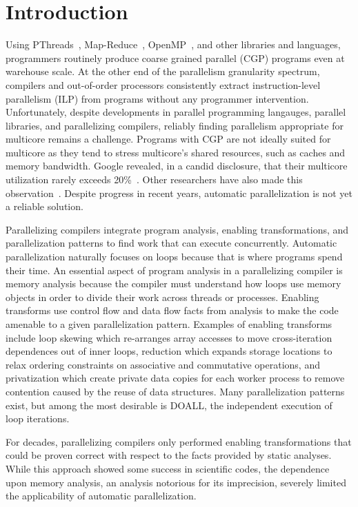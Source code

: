 \section{Introduction}

Using PThreads~\cite{pthreads:spec}, Map-Reduce~\cite{dean:04:osdi},
OpenMP~\cite{openmp:spec}, and other libraries and languages,
programmers routinely produce coarse grained parallel (CGP) programs
even at warehouse scale.  At the other end of the parallelism
granularity spectrum, compilers and out-of-order processors
consistently extract instruction-level parallelism (ILP) from programs
without any programmer intervention.  Unfortunately, despite
developments in parallel programming langauges, parallel libraries,
and parallelizing compilers, reliably finding parallelism appropriate
for multicore remains a challenge.  Programs with CGP are not ideally
suited for multicore as they tend to stress multicore's shared
resources, such as caches and memory bandwidth.  Google revealed, in a
candid disclosure, that their multicore utilization rarely exceeds
20\%~\cite{barroso:07:computer}. Other researchers have also made this
observation~\cite{chung:13:isca}.  Despite progress in recent years,
automatic parallelization is not yet a reliable solution.

Parallelizing compilers integrate program analysis,
enabling transformations, and parallelization patterns to
find work that can execute concurrently.  Automatic parallelization
naturally focuses on loops because that is where programs spend their
time.  An essential aspect of program analysis in a parallelizing
compiler is memory analysis because the compiler must understand how
loops use memory objects in order to divide their work across threads
or processes.  Enabling transforms use control flow and data flow
facts from analysis to make the code amenable to a given
parallelization pattern.  Examples of enabling transforms include loop
skewing which re-arranges array accesses to move cross-iteration
dependences out of inner loops, reduction which expands storage
locations to relax ordering constraints on associative and commutative
operations, and privatization which create private data copies for
each worker process to remove contention caused by the reuse of data
structures.  Many parallelization patterns exist, but among the most
desirable is DOALL, the independent execution of loop iterations.

For decades, parallelizing compilers only performed enabling
transformations that could be proven correct with respect to the facts
provided by static analyses.  While this approach showed some success
in scientific codes, the dependence upon memory analysis, an analysis
notorious for its imprecision, severely limited the applicability of
automatic parallelization.

